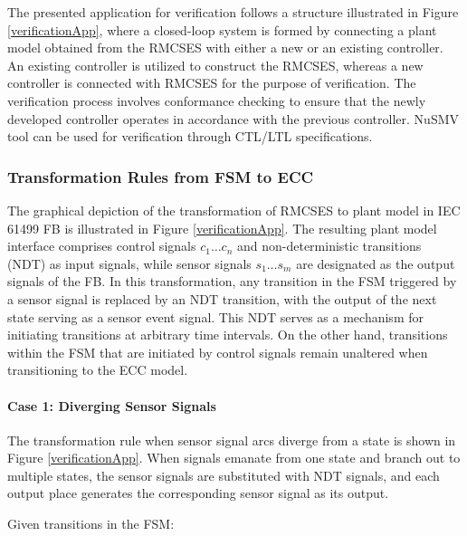 \begin{bibunit}
The presented application for verification follows a structure illustrated in Figure \ref{verificationApp}, where a closed-loop system is formed by connecting a plant model obtained from the RMCSES with either a new or an existing controller. An existing controller is utilized to construct the RMCSES, whereas a new controller is connected with RMCSES for the purpose of verification. The verification process involves conformance checking to ensure that the newly developed controller operates in accordance with the previous controller. NuSMV tool can be used for verification through CTL/LTL specifications.





\subsubsection{Transformation Rules from FSM to ECC }



The graphical depiction of the transformation of RMCSES to plant model in IEC 61499 FB is illustrated in Figure \ref{verificationApp}. The resulting plant model interface comprises control signals $c_1 \dots c_n$ and non-deterministic transitions (NDT) as input signals, while sensor signals $s_1 \dots s_m$ are designated as the output signals of the FB. In this transformation, any transition in the FSM triggered by a sensor signal is replaced by an NDT transition, with the output of the next state serving as a sensor event signal. This NDT serves as a mechanism for initiating transitions at arbitrary time intervals.  On the other hand, transitions within the FSM that are initiated by control signals remain unaltered when transitioning to the ECC model.




\paragraph{Case 1: Diverging Sensor Signals }



The transformation rule when sensor signal arcs diverge from a state is shown in Figure \ref{verificationApp}. When signals emanate from one state and branch out to multiple states, the sensor signals are substituted with NDT signals, and each output place generates the corresponding sensor signal as its output.



Given transitions in the FSM:



\end{bibunit}
